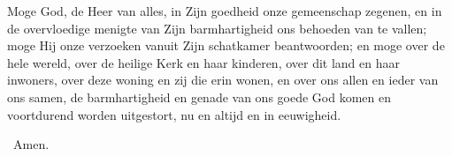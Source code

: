 \documentclass[12pt,twoside,a5paper]{article}
\begin{document}
\begin{halfparskip}
    Moge God, de Heer van alles, in Zijn goedheid onze gemeenschap zegenen, en in de overvloedige menigte van Zijn barmhartigheid ons behoeden van te vallen; moge Hij onze verzoeken vanuit Zijn schatkamer beantwoorden; en moge over de hele wereld, over de heilige Kerk en haar kinderen, over dit land en haar inwoners, over deze woning en zij die erin wonen, en over ons allen en ieder van ons samen, de barmhartigheid en genade van ons goede God komen en voortdurend worden uitgestort, nu en altijd en in eeuwigheid.

  \rr~Amen.
\end{halfparskip}

\end{document}

